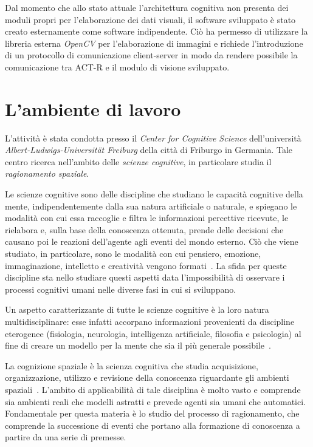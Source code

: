 	Dal momento che allo stato attuale l'architettura cognitiva non presenta dei moduli propri per l'elaborazione dei dati visuali, il software sviluppato è stato creato esternamente come software indipendente. 
	Ciò ha permesso di utilizzare la libreria esterna \mbox{\emph{OpenCV}} per l'elaborazione di immagini e richiede l'introduzione di un protocollo di comunicazione client-server in modo da rendere possibile la comunicazione tra \mbox{ACT-R} e il modulo di visione sviluppato.

	\section*{L'ambiente di lavoro}
	L'attività è stata condotta presso il \emph{Center for Cognitive Science} dell'università \emph{Albert-Ludwigs-Universität Freiburg} della città di Friburgo in Germania. Tale centro ricerca nell'ambito delle \emph{scienze cognitive}, in particolare studia il \emph{ragionamento spaziale}.

	Le scienze cognitive sono delle discipline che studiano le capacità cognitive della mente, indipendentemente dalla sua natura artificiale o naturale, e spiegano le modalità con cui essa raccoglie e filtra le informazioni percettive ricevute, le rielabora e, sulla base della conoscenza ottenuta, prende delle decisioni che causano poi le reazioni dell'agente agli eventi del mondo esterno. 
	Ciò che viene studiato, in particolare, sono le modalità con cui pensiero, emozione, immaginazione, intelletto e creatività vengono formati~\cite{legrenzi2005prima}.
	La sfida per queste discipline sta nello studiare questi aspetti data l'impossibilità di osservare i processi cognitivi umani nelle diverse fasi in cui si sviluppano. 
	
	Un aspetto caratterizzante di tutte le scienze cognitive è la loro natura multidisciplinare: esse infatti accorpano informazioni provenienti da discipline eterogenee (fisiologia, neurologia, intelligenza artificiale, filosofia e psicologia) al fine di creare un modello per la mente che sia il più generale possibile~\cite{legrenzi2005prima}. 

	La cognizione spaziale è la scienza cognitiva che studia acquisizione, organizzazione, utilizzo e revisione della conoscenza riguardante gli ambienti spaziali~\cite{r8Cspace}. L'ambito di applicabilità di tale disciplina è molto vasto e comprende sia ambienti reali che modelli astratti e prevede agenti sia umani che automatici.
	Fondamentale per questa materia è lo studio del processo di ragionamento, che comprende la successione di eventi che portano alla formazione di conoscenza a partire da una serie di premesse. 
	
